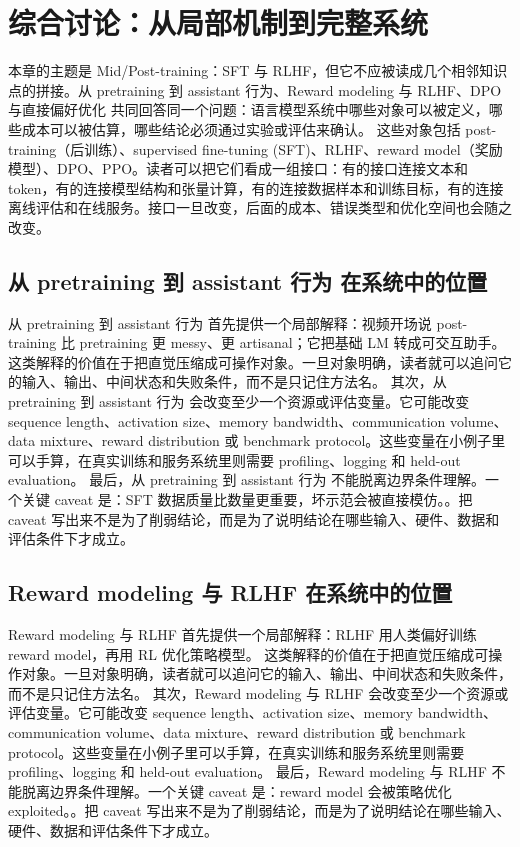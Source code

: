 \documentclass[a4paper]{article}
\begin{document}
\section{综合讨论：从局部机制到完整系统}
本章的主题是 Mid/Post-training：SFT 与 RLHF，但它不应被读成几个相邻知识点的拼接。从 pretraining 到 assistant 行为、Reward modeling 与 RLHF、DPO 与直接偏好优化 共同回答同一个问题：语言模型系统中哪些对象可以被定义，哪些成本可以被估算，哪些结论必须通过实验或评估来确认。
这些对象包括 post-training（后训练）、supervised fine-tuning (SFT)、RLHF、reward model（奖励模型）、DPO、PPO。读者可以把它们看成一组接口：有的接口连接文本和 token，有的连接模型结构和张量计算，有的连接数据样本和训练目标，有的连接离线评估和在线服务。接口一旦改变，后面的成本、错误类型和优化空间也会随之改变。
\subsection{从 pretraining 到 assistant 行为 在系统中的位置}
从 pretraining 到 assistant 行为 首先提供一个局部解释：视频开场说 post-training 比 pretraining 更 messy、更 artisanal；它把基础 LM 转成可交互助手。 这类解释的价值在于把直觉压缩成可操作对象。一旦对象明确，读者就可以追问它的输入、输出、中间状态和失败条件，而不是只记住方法名。
其次，从 pretraining 到 assistant 行为 会改变至少一个资源或评估变量。它可能改变 sequence length、activation size、memory bandwidth、communication volume、data mixture、reward distribution 或 benchmark protocol。这些变量在小例子里可以手算，在真实训练和服务系统里则需要 profiling、logging 和 held-out evaluation。
最后，从 pretraining 到 assistant 行为 不能脱离边界条件理解。一个关键 caveat 是：SFT 数据质量比数量更重要，坏示范会被直接模仿。。把 caveat 写出来不是为了削弱结论，而是为了说明结论在哪些输入、硬件、数据和评估条件下才成立。
\subsection{Reward modeling 与 RLHF 在系统中的位置}
Reward modeling 与 RLHF 首先提供一个局部解释：RLHF 用人类偏好训练 reward model，再用 RL 优化策略模型。 这类解释的价值在于把直觉压缩成可操作对象。一旦对象明确，读者就可以追问它的输入、输出、中间状态和失败条件，而不是只记住方法名。
其次，Reward modeling 与 RLHF 会改变至少一个资源或评估变量。它可能改变 sequence length、activation size、memory bandwidth、communication volume、data mixture、reward distribution 或 benchmark protocol。这些变量在小例子里可以手算，在真实训练和服务系统里则需要 profiling、logging 和 held-out evaluation。
最后，Reward modeling 与 RLHF 不能脱离边界条件理解。一个关键 caveat 是：reward model 会被策略优化 exploited。。把 caveat 写出来不是为了削弱结论，而是为了说明结论在哪些输入、硬件、数据和评估条件下才成立。
\end{document}
